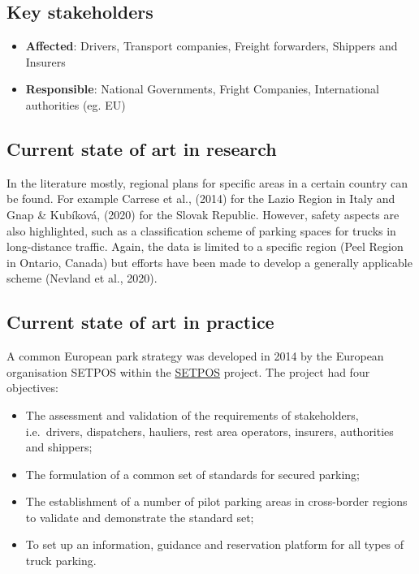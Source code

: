 \documentclass[
]{book}
\providecommand{\tightlist}{%
  \setlength{\itemsep}{0pt}\setlength{\parskip}{0pt}}
\begin{document}
\hypertarget{key-stakeholders-23}{%
\subsection*{Key stakeholders}\label{key-stakeholders-23}}

\begin{itemize}
\tightlist
\item
  \textbf{Affected}: Drivers, Transport companies, Freight forwarders, Shippers and Insurers
\item
  \textbf{Responsible}: National Governments, Fright Companies, International authorities (eg. EU)
\end{itemize}

\hypertarget{current-state-of-art-in-research-23}{%
\subsection*{Current state of art in research}\label{current-state-of-art-in-research-23}}

In the literature mostly, regional plans for specific areas in a certain country can be found. For example Carrese et al., (2014) for the Lazio Region in Italy and Gnap \& Kubíková, (2020) for the Slovak Republic. However, safety aspects are also highlighted, such as a classification scheme of parking spaces for trucks in long-distance traffic. Again, the data is limited to a specific region (Peel Region in Ontario, Canada) but efforts have been made to develop a generally applicable scheme (Nevland et al., 2020).

\hypertarget{current-state-of-art-in-practice-22}{%
\subsection*{Current state of art in practice}\label{current-state-of-art-in-practice-22}}

A common European park strategy was developed in 2014 by the European organisation SETPOS within the \href{https://ec.europa.eu/transport/sites/transport/files/modes/road/parking/doc/2010_04_28_setpos_project_handbook.pdf}{SETPOS} project. The project had four objectives:

\begin{itemize}
\tightlist
\item
  The assessment and validation of the requirements of stakeholders, i.e.~drivers, dispatchers, hauliers, rest area operators, insurers, authorities and shippers;
\item
  The formulation of a common set of standards for secured parking;
\item
  The establishment of a number of pilot parking areas in cross-border regions to validate and demonstrate the standard set;
\item
  To set up an information, guidance and reservation platform for all types of truck parking.
\end{itemize}
\end{document}
